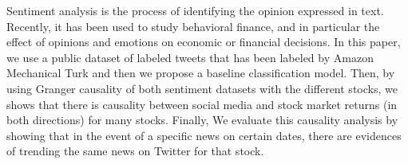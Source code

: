 Sentiment analysis is the process of identifying the opinion expressed in text. Recently, it has been used to study behavioral finance, and in particular the effect of opinions and emotions on economic or financial decisions. In this paper, we use a public dataset of labeled tweets that has been labeled by Amazon Mechanical Turk and then we propose a baseline classification model. Then, by using Granger causality of both sentiment datasets with the different stocks, we shows that there is causality between social media and stock market returns (in both directions) for many stocks. Finally, We evaluate this causality analysis by showing that in the event of a specific news on certain dates, there are evidences of trending the same news on Twitter for that stock.
